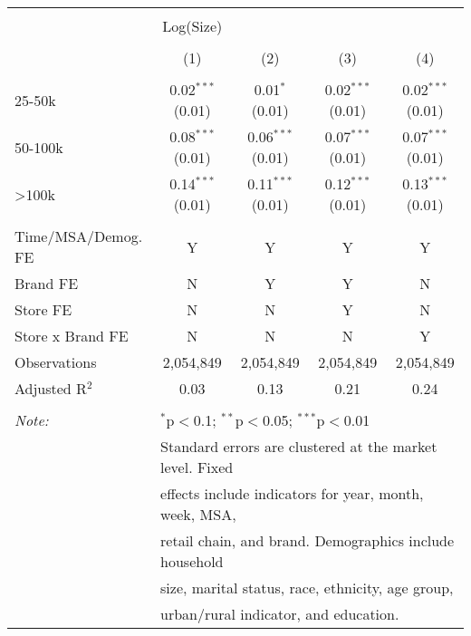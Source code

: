 
\begin{table}[!htbp] \centering 
  \caption{} 
  \label{tab:packageSizeFull7870} 
\begin{tabular}{@{\extracolsep{5pt}}lcccc} 
\\[-1.8ex]\hline 
\hline \\[-1.8ex] 
 & Log(Size) &  &  &  \\ 
\\[-1.8ex] & (1) & (2) & (3) & (4)\\ 
\hline \\[-1.8ex] 
 25-50k & 0.02$^{***}$ (0.01) & 0.01$^{*}$ (0.01) & 0.02$^{***}$ (0.01) & 0.02$^{***}$ (0.01) \\ 
  50-100k & 0.08$^{***}$ (0.01) & 0.06$^{***}$ (0.01) & 0.07$^{***}$ (0.01) & 0.07$^{***}$ (0.01) \\ 
  >100k & 0.14$^{***}$ (0.01) & 0.11$^{***}$ (0.01) & 0.12$^{***}$ (0.01) & 0.13$^{***}$ (0.01) \\ 
 \hline \\[-1.8ex] 
Time/MSA/Demog. FE & Y & Y & Y & Y \\ 
Brand FE & N & Y & Y & N \\ 
Store FE & N & N & Y & N \\ 
Store x Brand FE & N & N & N & Y \\ 
Observations & 2,054,849 & 2,054,849 & 2,054,849 & 2,054,849 \\ 
Adjusted R$^{2}$ & 0.03 & 0.13 & 0.21 & 0.24 \\ 
\hline 
\hline \\[-1.8ex] 
\textit{Note:}  & \multicolumn{4}{l}{$^{*}$p$<$0.1; $^{**}$p$<$0.05; $^{***}$p$<$0.01} \\ 
 & \multicolumn{4}{l}{Standard errors are clustered at the market level. Fixed } \\ 
 & \multicolumn{4}{l}{effects include indicators for year, month, week, MSA, } \\ 
 & \multicolumn{4}{l}{retail chain, and brand. Demographics include household } \\ 
 & \multicolumn{4}{l}{size, marital status, race, ethnicity, age group, } \\ 
 & \multicolumn{4}{l}{urban/rural indicator, and education.} \\ 
\end{tabular} 
\end{table} 
